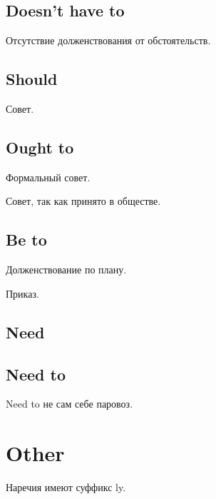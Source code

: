 \documentclass[oneside]{book}
\begin{document}
\section{Doesn't have to}
Отсутствие долженствования от обстоятельств.

\section{Should}
Совет.

\section{Ought to}
Формальный совет.

Совет, так как принято в обществе.

\section{Be to}
Долженствование по плану.

Приказ.

\section{Need}

\section{Need to}
Need to не сам себе паровоз.

\chapter{Other}
Наречия имеют суффикс ly.
\end{document}
